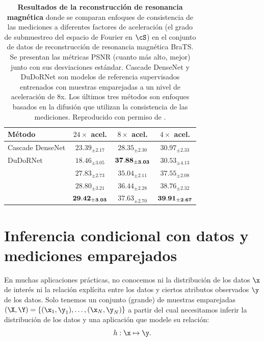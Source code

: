 \documentclass[../../book-main_es.tex]{subfiles}
\begin{document}
\begin{table}[t]
    \centering
    \begin{tabular}{@{}lccc@{}}
        \toprule
        Método & $24\times$ acel. & $8\times$ acel. & $4\times$ acel. \\
        \midrule
        Cascade DenseNet & $23.39_{\pm 2.17}$ & $28.35_{\pm 2.30}$ &
        $30.97_{\pm 2.33}$ \\
        DuDoRNet & $18.46_{\pm 3.05}$ & $\bf 37.88_{\pm 3.03}$ &
        $30.53_{\pm 4.13}$ \\
        \textcite{song2020score} & $27.83_{\pm 2.73}$ & $35.04_{\pm
        2.11}$ & $37.55_{\pm 2.08}$ \\
        \textcite{NEURIPS2021_7d6044e9} & $28.80_{\pm 3.21}$ &
        $36.44_{\pm 2.28}$ & $38.76_{\pm 2.32}$ \\
        \textcite{song2022solving} & $\bf 29.42_{\pm 3.03}$ &
        $37.63_{\pm 2.70}$ & $\bf 39.91_{\pm 2.67}$ \\
        \bottomrule
    \end{tabular}
    \caption{\textbf{Resultados de la reconstrucción de resonancia magnética} donde se comparan
        enfoques de consistencia de las mediciones a diferentes factores de aceleración
        (el grado de submuestreo del espacio de Fourier en $\cS$) en el conjunto de datos
        de reconstrucción de resonancia magnética BraTS. Se presentan las métricas PSNR
        (cuanto más alto, mejor) junto con sus desviaciones estándar. Cascade DenseNet
        \cite{NEURIPS2019_1e48c442} y DuDoRNet \cite{9156506} son modelos de referencia supervisados
        entrenados con muestras emparejadas a un nivel de aceleración de 8x.
        Los últimos
        tres métodos son enfoques basados en la difusión que utilizan
        la consistencia de las mediciones.
    Reproducido con permiso de \textcite{song2022solving}.}
    \label{tab:mri-reconstruction}
\end{table}

\section{Inferencia condicional con datos y mediciones emparejados}
\label{sec:paired-data}
En muchas aplicaciones prácticas, no conocemos ni la
distribución de los datos $\x$ de interés ni la relación explícita
entre los datos y ciertos atributos observados $\y$ de
los datos. Solo tenemos un conjunto (grande) de muestras emparejadas $(\X, \Y) =
\{ (\x_1, \y_1), \ldots, (\x_N, \y_N) \}$ a partir del cual necesitamos inferir
la distribución de los datos y una aplicación que modele su relación:
\begin{equation}
    h: \x \mapsto \y.
\end{equation}
\end{document}
